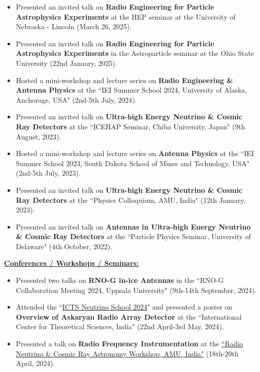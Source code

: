 \documentclass[10pt]{report}
\begin{document}
\begin{itemize}
\item Presented an invited talk on {\bf Radio Engineering for Particle Astrophysics Experiments} at the HEP seminar at the University of Nebraska - Lincoln (March 26, 2025).
\item Presented an invited talk on {\bf Radio Engineering for Particle Astrophysics Experiments} in the Astroparticle seminar at the Ohio State University (22nd January, 2025).
\item Hosted a mini-workshop and lecture series on {\bf Radio Engineering \& Antenna Physics}  at the ``IEI Summer School 2024, University of Alaska, Anchorage, USA"  (2nd-5th July, 2024).
\item Presented an invited talk on {\bf Ultra-high Energy Neutrino \& Cosmic Ray Detectors}  at the ``ICEHAP Seminar, Chiba University, Japan"  (9th August, 2023).
\item Hosted a mini-workshop and lecture series on {\bf Antenna Physics}  at the ``IEI Summer School 2023, South Dakota School of Mines and Technology, USA"  (2nd-5th July, 2023).
\item Presented an invited talk on {\bf Ultra-high Energy Neutrino \& Cosmic Ray Detectors}  at the ``Physics Colloquium, AMU, India"  (12th January, 2023).
\item Presented an invited talk on {\bf Antennas in Ultra-high Energy Neutrino \& Cosmic Ray Detectors}  at the ``Particle Physics Seminar, University of Delaware"  (4th October, 2022).
\end{itemize}\begin{large}\vspace{2mm}
\textbf{\underline{Conferences / Workshops / Seminars:}}
\end{large}\begin{itemize}
\item Presented two talks on {\bf RNO-G in-ice Antennas}  in the ``RNO-G Collaboration Meeting 2024, Uppsala University"  (9th-14th September, 2024).
\item Attended the ``\href{https://www.icts.res.in/program/neus2024}{ICTS Neutrino School 2024}" and presented a poster on {\bf Overview of Askaryan Radio Array Detector}  at the ``International Center for Theoretical Sciences, India"  (22nd April-3rd May, 2024).
\item Presented a talk on {\bf Radio Frequency Instrumentation}  at the \href{https://indico.ku.edu/event/388/overview}{``Radio Neutrino \& Cosmic Ray Astronomy Workshop, AMU, India"}  (18th-20th April, 2024).

\end{itemize}
\end{document}
